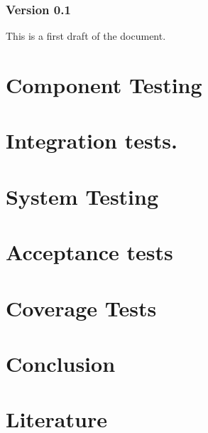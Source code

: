 \documentclass[signature]{deltares_report}
\begin{document}
\subsection{Version 0.1}
\label{sec:Version}
This is a first draft of the document.

\chapter{Component Testing} 
\label{chapterUnitTest}


\chapter{Integration tests.}
\label{chapterIntegrationTests}


\chapter{System Testing} 
\label{chapterSystemTest}


\chapter{Acceptance tests} 
\label{chapterAcceptanceTest}


\chapter{Coverage Tests} 
\label{chapterCoverage}


\chapter{Conclusion} 
\label{chapterConclusion}


\chapter{Literature}  \label{chapterLiterature}



\pagestyle{empty}
\mbox{}

\end{document}
